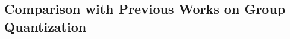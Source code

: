 \documentclass{article} %
\newcommand{\KronQ}{\textsc{KronQ}}
\begin{document}
\vspace{-4mm}
\subsection{Comparison with Previous Works on Group Quantization}
\label{appendix:comparison_group}

\vspace{-3mm}

\end{document}
